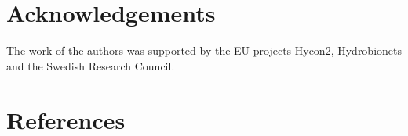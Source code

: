 \documentclass[review, 1p, 11pt]{elsarticle}
\numberwithin{equation}{section}
\begin{document}
\section*{Acknowledgements}
The work of the authors was supported by the EU projects Hycon2, Hydrobionets and the Swedish Research Council.

\section*{References}


\end{document}
